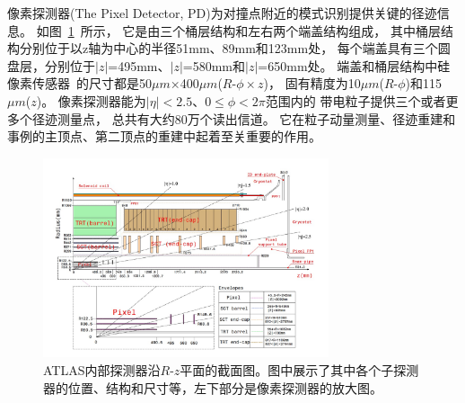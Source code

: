 像素探测器(The Pixel Detector, PD)为对撞点附近的模式识别提供关键的径迹信息。
如图~\ref{fig:ATLAS9}~所示，
它是由三个桶层结构和左右两个端盖结构组成，
其中桶层结构分别位于以z轴为中心的半径51mm、89mm和123mm处，
每个端盖具有三个圆盘层，分别位于$|z|$=495mm、$|z|$=580mm和$|z|$=650mm处。
端盖和桶层结构中硅像素传感器~\cite{PDSS}的尺寸都是50$\mu m$×400$\mu m$($R$-$\phi\times z$)，
固有精度为10$\mu m$($R$-$\phi$)和115$\mu m$($z$)。
像素探测器能为$|\eta|<2.5$、$0\le\phi<2\pi$范围内的
带电粒子提供三个或者更多个径迹测量点，
总共有大约80万个读出信道。
它在粒子动量测量、径迹重建和事例的主顶点、第二顶点的重建中起着至关重要的作用。

\begin{figure}
  \begin{center}
    \includegraphics[width=0.75\textwidth]{figuresEXP/ATLAS9.jpg}
  \end{center}
  \caption{
ATLAS内部探测器沿$R$-$z$平面的截面图。图中展示了其中各个子探测器的位置、结构和尺寸等，左下部分是像素探测器的放大图。
  }
    \label{fig:ATLAS9}
\end{figure}

